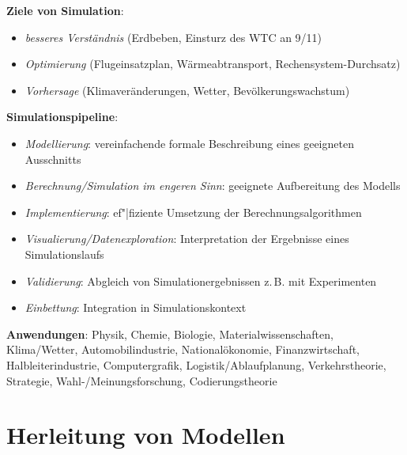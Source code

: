 \textbf{Ziele von Simulation}:
\begin{itemize}
    \item
    \emph{besseres Verständnis}
    (Erdbeben, Einsturz des WTC an 9/11)

    \item
    \emph{Optimierung}
    (Flugeinsatzplan, Wärmeabtransport, Rechensystem-Durchsatz)

    \item
    \emph{Vorhersage}
    (Klimaveränderungen, Wetter, Bevölkerungswachstum)
\end{itemize}

\linie

\textbf{Simulationspipeline}:
\begin{itemize}
    \item
    \emph{Modellierung}:
    vereinfachende formale Beschreibung eines geeigneten Ausschnitts

    \item
    \emph{Berechnung/Simulation im engeren Sinn}:
    geeignete Aufbereitung des Modells

    \item
    \emph{Implementierung}:
    ef"|fiziente Umsetzung der Berechnungsalgorithmen

    \item
    \emph{Visualierung/Datenexploration}:
    Interpretation der Ergebnisse eines Simulationslaufs

    \item
    \emph{Validierung}:
    Abgleich von Simulationergebnissen z.\,B. mit Experimenten

    \item
    \emph{Einbettung}:
    Integration in Simulationskontext
\end{itemize}

\linie

\textbf{Anwendungen}:
Physik,
Chemie,
Biologie,
Materialwissenschaften,
Klima/Wetter,
Automobilindustrie,
Nationalökonomie,
Finanzwirtschaft,
Halbleiterindustrie,
Computergrafik,
Logistik/Ablaufplanung,
Verkehrstheorie,
Strategie,
Wahl-/Meinungsforschung,
Codierungstheorie

\pagebreak

\section{%
    Herleitung von Modellen%
}


